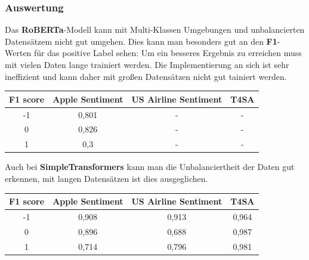 \subsubsection*{Auswertung}
Das \textbf{RoBERTa}-Modell kann mit Multi-Klassen Umgebungen und unbalancierten Datens\"atzem nicht gut umgehen. Dies kann man besonders gut an den \textbf{F1}-Werten f\"ur das positive Label sehen: Um ein besseres Ergebnis zu erreichen muss mit vielen Daten lange trainiert werden. Die Implementierung an sich ist sehr ineffizient und kann daher mit gro{\ss}en Datens\"atzen nicht gut tainiert werden.
\begin{center}
\begin{tabular}{|c||c|c|c|}
\hline
F1 score & Apple Sentiment & US Airline Sentiment & T4SA\\ 
\hline\hline
-1 & 0,801 & - & -\\
\hline
0 & 0,826 & - & -\\ 
\hline
1 & 0,3 & - & -\\
\hline    
\end{tabular}
\end{center}
Auch bei \textbf{SimpleTransformers} kann man die Unbalanciertheit der Daten gut erkennen, mit langen Datens\"atzen ist dies ausgeglichen.
\begin{center}
\begin{tabular}{|c||c|c|c|}
\hline
F1 score & Apple Sentiment & US Airline Sentiment & T4SA\\ 
\hline\hline
-1 & 0,908 & 0,913 & 0,964\\
\hline
0 & 0,896 & 0,688 & 0,987\\ 
\hline
1 & 0,714 & 0,796 &  0,981\\
\hline    
\end{tabular}
\end{center}

